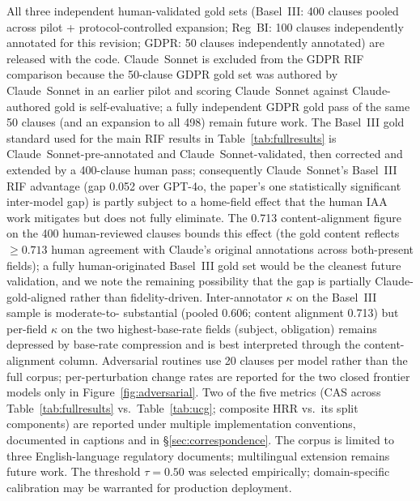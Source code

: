 \documentclass{article}
\begin{document}
All three independent human-validated gold sets (Basel~III: 400
clauses pooled across pilot + protocol-controlled expansion;
Reg~BI: 100 clauses independently annotated for this revision;
GDPR: 50 clauses independently annotated) are released with the code.
Claude~Sonnet is excluded from the GDPR RIF comparison
because the 50-clause GDPR gold set was authored by Claude~Sonnet
in an earlier pilot and scoring Claude~Sonnet against Claude-authored
gold is self-evaluative; a fully independent GDPR gold pass of the
same 50 clauses (and an expansion to all 498) remain future work.
The Basel~III gold standard used for the main RIF results in
Table~\ref{tab:fullresults} is Claude~Sonnet-pre-annotated and
Claude~Sonnet-validated, then corrected and extended by a
400-clause human pass; consequently Claude~Sonnet's Basel~III
RIF advantage (gap 0.052 over GPT-4o, the paper's one
statistically significant inter-model gap) is partly subject to a
home-field effect that the human IAA work mitigates but does not
fully eliminate. The 0.713 content-alignment figure on the 400
human-reviewed clauses bounds this effect (the gold content
reflects $\geq 0.713$ human agreement with Claude's original
annotations across both-present fields); a fully
human-originated Basel~III gold set would be the cleanest future
validation, and we note the remaining possibility that the gap
is partially Claude-gold-aligned rather than fidelity-driven.
Inter-annotator $\kappa$ on the Basel~III sample is moderate-to-
substantial (pooled 0.606; content alignment 0.713) but per-field
$\kappa$ on the two highest-base-rate fields (subject, obligation)
remains depressed by base-rate compression and is best interpreted
through the content-alignment column.
Adversarial routines use 20 clauses per model rather than the full
corpus; per-perturbation change rates are reported for the two
closed frontier models only in Figure~\ref{fig:adversarial}.
Two of the five metrics (CAS across Table~\ref{tab:fullresults} vs.\
Table~\ref{tab:ucg}; composite HRR vs.\ its split components) are
reported under multiple implementation conventions, documented in
captions and in \S\ref{sec:correspondence}.
The corpus is limited to three English-language regulatory documents;
multilingual extension remains future work.
The threshold $\tau=0.50$ was selected empirically; domain-specific
calibration may be warranted for production deployment.

\end{document}
